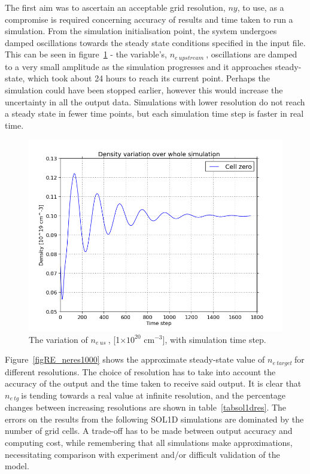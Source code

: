 \documentclass[12pt]{article}  %
\providecommand{\e}[1]{\ensuremath{\times 10^{#1}}} %
\providecommand{\pow}[1]{{$^{#1}$}} %
\providecommand{\neupstream}{$n_{e~upstream}~$} %
\providecommand{\neus}{$n_{e~us}~$} %
\providecommand{\netarget}{$n_{e~target}~$} %
\providecommand{\netg}{$n_{e~tg}~$} %
\begin{document}
The first aim was to ascertain an acceptable grid resolution, $ny$, to use, as a compromise is required concerning accuracy of results and time taken to run a simulation. From the simulation initialisation point, the system undergoes damped oscillations towards the steady state conditions specified in the input file. This can be seen in figure~\ref{figne_var_ny=800} - the variable's, \neupstream, oscillations are damped to a very small amplitude as the simulation progresses and it approaches steady-state, which took about 24 hours to reach its current point. Perhaps the simulation could have been stopped earlier, however this would increase the uncertainty in all the output data. Simulations with lower resolution do not reach a steady state in fewer time points, but each simulation time step is faster in real time.

\begin{figure}
	\includegraphics[scale=0.6]{Figures/sol1d/ne_var_ny=800.png}
	\centering
	\caption{The variation of \neus, [1\e{20} cm\pow{-3}], with simulation time step. }\label{figne_var_ny=800}
\end{figure}

Figure~\ref{figRE_neres1000} shows the approximate steady-state value of \netarget for different resolutions. The choice of resolution has to take into account the accuracy of the output and the time taken to receive said output. It is clear that \netg is tending towards a real value at infinite resolution, and the percentage changes between increasing resolutions are shown in table~\ref{tabsol1dres}. The errors on the results from the following SOL1D simulations are dominated by the number of grid cells. A trade-off has to be made between output accuracy and computing cost, while remembering that all simulations make approximations, necessitating comparison with experiment and/or difficult validation of the model.
\end{document}

